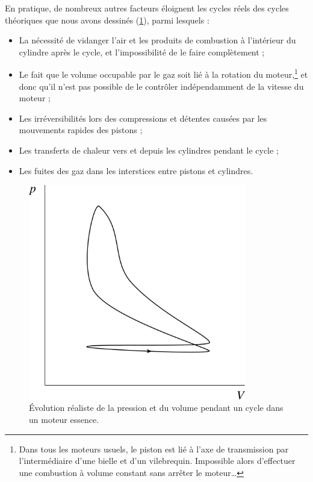 		En pratique, de nombreux autres facteurs éloignent les cycles réels des cycles théoriques que nous avons dessinés (\cref{fig_cycle_otto_réel}), parmi lesquels :

		\begin{itemize}
			\item La nécessité de vidanger l’air et les produits de combustion à l’intérieur du cylindre après le cycle, et l’impossibilité de le faire complètement ;
			\item Le fait que le volume occupable par le gaz soit lié à la rotation du moteur,\footnote{Dans tous les moteurs usuels, le piston est lié à l’axe de transmission par l’intermédiaire d’une bielle et d’un vilebrequin. Impossible alors d’effectuer une combustion à volume constant sans arrêter le moteur…}
			et donc qu’il n’est pas possible de le contrôler indépendamment de la vitesse du moteur ;
			\item Les irréversibilités lors des compressions et détentes causées par les mouvements rapides des pistons ;
			\item Les transferts de chaleur vers et depuis les cylindres pendant le cycle ;
			\item Les fuites des gaz dans les interstices entre pistons et cylindres.
		\end{itemize}

		\begin{figure}
			\begin{center}
				\includegraphics[width=9.5cm]{images/pv_moteur_reel.png}
			\end{center}
			\caption{Évolution réaliste de la pression et du volume pendant un cycle dans un moteur essence.}
			\label{fig_cycle_otto_réel}
		\end{figure}

